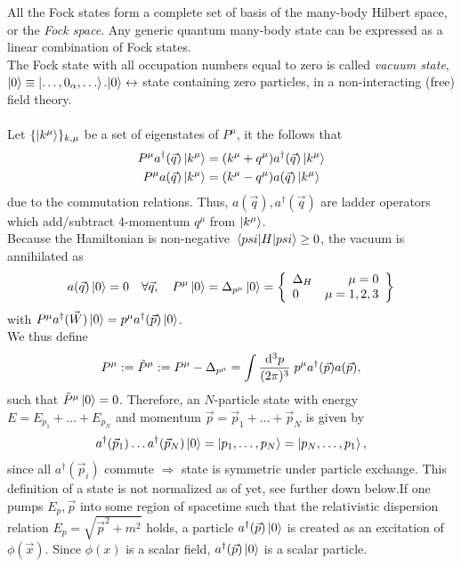 All the Fock states form a complete set of basis of the many-body Hilbert space, or the \emph{Fock space}. Any generic quantum many-body state can be expressed as a linear combination of Fock states.\\
The Fock state with all occupation numbers equal to zero is called \emph{vacuum state}, $\ket{0}\equiv \ket{\dots,0_{\alpha}, \dots}$.$\ket{0}\leftrightarrow$ state containing zero particles, in a non-interacting (free) field theory.\\
\\
Let $\{\ket{k^{\mu}}\}_{k,\mu}$ be a set of eigenstates of $P^{\mu}$, it the follows that
\begin{align}
	P^{\mu} a^{\dagger}(\vec{q}) \ket{k^{\mu}} &= (k^{\mu}+q^{\mu}) a^{\dagger}(\vec{q}) \ket{k^{\mu}}\\
	P^{\mu} a(\vec{q}) \ket{k^{\mu}} &= (k^{\mu}-q^{\mu}) a(\vec{q}) \ket{k^{\mu}}
\end{align}
due to the commutation relations. Thus, $a(\vec{q}),a^{\dagger}(\vec{q})$ are ladder operators which add/subtract 4-momentum $q^{\mu}$ from $\ket{k^{\mu}}$.\\
Because the Hamiltonian is non-negative $\expval{H}{psi} \geq 0$, the vacuum is annihilated as
\begin{equation}
	a(\vec{q}) \ket{0} = 0 \quad \forall \vec{q}, \quad P^{\mu} \ket{0}=\Delta_{p^{\mu}} \ket{0} = \left\{\begin{array}{lr}
	\Delta_H & \mu=0 \\
	0 & \mu =1,2,3 
	\end{array}		\right\}
\end{equation}
with $P^{\mu} a^{\dagger}(\vec{W})\ket{0}=p^{\mu} a^{\dagger}(\vec{p})\ket{0}$.\\
We thus define
\begin{equation}
	P^{\mu} := \tilde{P}^{\mu} := P^{\mu} - \Delta_{p^{\mu}} = \int \frac{\mathrm{d}^3 p}{(2 \pi)^3} \; p^{\mu} a^{\dagger}(\vec{p})a(\vec{p}),
\end{equation}
such that $\tilde{P}^{\mu} \ket{0}=0$.
Therefore, an $N$-particle state with energy $E=E_{p_1}+\dots+ E_{p_N}$ and momentum $\vec{p}=\vec{p}_1 +\dots + \vec{p}_N$ is given by 
\begin{equation}
	a^{\dagger}(\vec{p}_1)\dots a^{\dagger}(\vec{p}_N) \ket{0} = \ket{p_1,\dots,p_N} = \ket{p_N, \dots,p_1},
\end{equation}
since all $a^{\dagger}(\vec{p}_i)$ commute $\Rightarrow$ state is symmetric under particle exchange. This definition of a state is not normalized as of yet, see further down below.If one pumps $E_p,\vec{p}$ into some region of spacetime such that the relativistic dispersion relation $E_p = \sqrt{\vec{p}^2+m^2}$ holds, a particle $a^{\dagger}(\vec{p}) \ket{0}$ is created as an excitation of $\phi(\vec{x})$. Since $\phi(x)$ is a scalar field, $a^{\dagger}(\vec{p})\ket{0}$ is a scalar particle.
